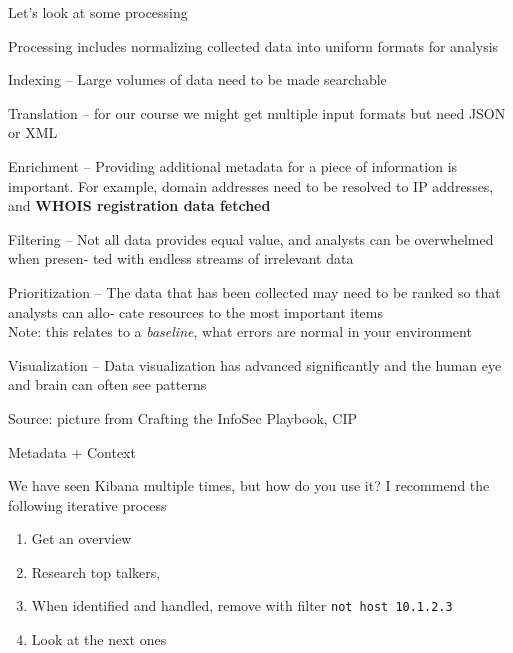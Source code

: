 \documentclass[Screen16to9,17pt]{foils}
\begin{document}

Let's look at some processing

\begin{list2}
\item Processing includes normalizing collected data into uniform formats for analysis
\item Indexing -- Large volumes of data need to be made searchable
\item Translation -- for our course we might get multiple input formats but need JSON or XML
\item Enrichment -- Providing additional metadata for a piece of information is important. For example, domain addresses need to be resolved to IP addresses, and {\bf WHOIS registration data fetched}
\item Filtering --
Not all data provides equal value, and analysts can be overwhelmed when presen‐
ted with endless streams of irrelevant data
\item Prioritization --
The data that has been collected may need to be ranked so that analysts can allo‐
cate resources to the most important items\\
Note: this relates to a \emph{baseline}, what errors are normal in your environment
\item Visualization -- Data visualization has advanced significantly and the human eye and brain can often see patterns
\end{list2}




Source: picture from Crafting the InfoSec Playbook, CIP

Metadata + Context





\begin{quote}

\end{quote}

We have seen Kibana multiple times, but how do you use it? I recommend the following iterative process
\begin{enumerate}
\item Get an overview
\item Research top talkers,
\item When identified and handled, remove with filter \verb+not host 10.1.2.3+
\item Look at the next ones
\end{enumerate}
\end{document}
